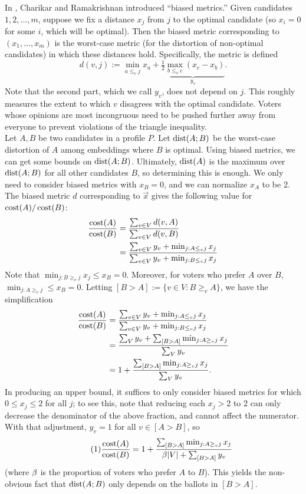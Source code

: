\documentclass{amsart}
\DeclareMathOperator{\cost}{\rm{cost}}
\DeclareMathOperator{\dist}{\rm{dist}}
\begin{document}
In \cite{CP2022}, Charikar and Ramakrishnan introduced ``biased metrics.'' Given candidates $1,2,\dots,m$, suppose we fix a distance $x_j$ from $j$ to the optimal candidate (so $x_i=0$ for some $i$, which will be optimal). Then the biased metric corresponding to $(x_1,\dots,x_m)$ is the worst-case metric (for the distortion of non-optimal candidates) in which these distances hold. Specifically, the metric is defined
$$
d(v,j) := \min_{a\leq_v j} x_a + \underbrace{\tfrac12 \max_{b\leq_v c} (x_c - x_b)}_{y_v}.
$$
Note that the second part, which we call $y_v$, does not depend on $j$. This roughly measures the extent to which $v$ disagrees with the optimal candidate. Voters whose opinions are most incongruous need to be pushed further away from everyone to prevent violations of the triangle inequality.\\

Let $A,B$ be two candidates in a profile $P$. Let $\dist(A;B)$ be the worst-case distortion of $A$ among embeddings where $B$ is optimal. Using biased metrics, we can get some bounds on $\dist(A;B)$. Ultimately, $\dist(A)$ is the maximum over $\dist(A;B)$ for all other candidates $B$, so determining this is enough. We only need to consider biased metrics with $x_B=0$, and we can normalize $x_A$ to be 2. The biased metric $d$ corresponding to $\vec{x}$ gives the following value for $\cost(A)/\cost(B)$:
\begin{align*}
	\frac{\cost(A)}{\cost(B)} &= \frac{\sum_{v\in V} d(v,A)}{\sum_{v\in V} d(v,B)}\\
	&= \frac{\sum_{v\in V} y_v + \min_{j:A\leq_v j} x_j}{\sum_{v\in V} y_v + \min_{j:B\leq_v j} x_j}
\end{align*}
Note that $\min_{j:B\geq_v j}x_j \leq x_B = 0$. Moreover, for voters who prefer $A$ over $B$, $\min_{j:A\geq_v j} \leq x_B = 0$. Letting $[B>A] := \{v\in V: B\geq_v A\}$, we have the simplification
\begin{align*}
	\frac{\cost(A)}{\cost(B)}
	&= \frac{\sum_{v\in V} y_v + \min_{j:A\leq_v j} x_j}{\sum_{v\in V} y_v + \min_{j:B\leq_v j} x_j}\\
	&= \frac{\sum_V y_v + \sum_{[B>A]} \min_{j:A\geq_v j} x_j}{\sum_V y_v}\\
	&= 1 + \frac{\sum_{[B>A]}\min_{j:A\geq_v j}x_j}{\sum_V y_v}.
\end{align*}
In producing an upper bound, it suffices to only consider biased metrics for which $0\leq x_j \leq 2$ for all $j$; to see this, note that reducing each $x_j>2$ to 2 can only decrease the denominator of the above fraction, and cannot affect the numerator. With that adjustment, $y_v=1$ for all $v\in [A>B]$, so
\begin{equation}
\tag{$1$}
\frac{\cost(A)}{\cost(B)} = 1 + \frac{\sum_{[B>A]} \min_{j:A\geq_v j} x_j}{ \b |V| + \sum_{[B>A]} y_v}
\end{equation}
(where $\beta$ is the proportion of voters who prefer $A$ to $B$). This yields the non-obvious fact that $\dist(A;B)$ only depends on the ballots in $[B>A]$.\\
\end{document}
